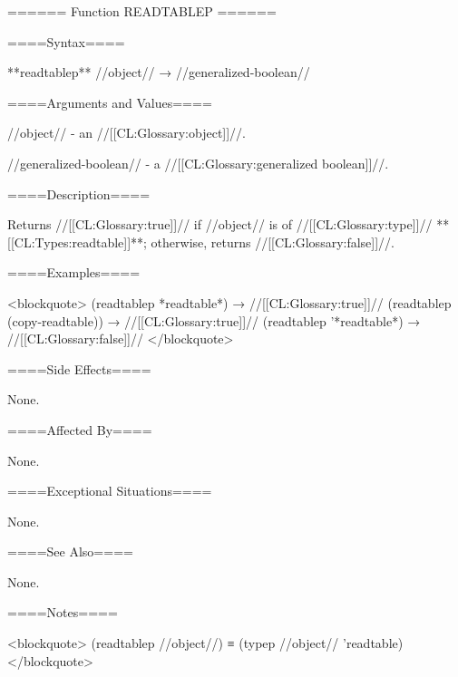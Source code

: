 ====== Function READTABLEP ======

====Syntax====

**readtablep** //object// → //generalized-boolean//

====Arguments and Values====

//object// - an //[[CL:Glossary:object]]//.

//generalized-boolean// - a //[[CL:Glossary:generalized boolean]]//.

====Description====

Returns //[[CL:Glossary:true]]// if //object// is of //[[CL:Glossary:type]]// **[[CL:Types:readtable]]**; otherwise, returns //[[CL:Glossary:false]]//.

====Examples====

<blockquote> (readtablep *readtable*) → //[[CL:Glossary:true]]// (readtablep (copy-readtable)) → //[[CL:Glossary:true]]// (readtablep '*readtable*) → //[[CL:Glossary:false]]// </blockquote>

====Side Effects====

None.

====Affected By====

None.

====Exceptional Situations====

None.

====See Also====

None.

====Notes====

<blockquote> (readtablep //object//) ≡ (typep //object// 'readtable) </blockquote>

